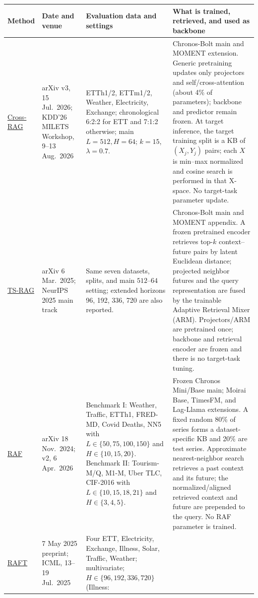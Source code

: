 \documentclass[10pt]{article}
\begin{document}
\small
\begin{longtable}{p{.14\linewidth}p{.17\linewidth}p{.27\linewidth}p{.31\linewidth}}
\toprule
Method & Date and venue & Evaluation data and settings & What is trained, retrieved, and used as backbone \\
\midrule
\endhead
\href{https://arxiv.org/pdf/2603.14709}{Cross-RAG}
& arXiv v3, 15 Jul.\ 2026; KDD'26 MILETS Workshop, 9--13 Aug.\ 2026
& ETTh1/2, ETTm1/2, Weather, Electricity, Exchange; chronological
6:2:2 for ETT and 7:1:2 otherwise; main $L=512,H=64$; $k=15$,
$\lambda=0.7$.
& Chronos-Bolt main and MOMENT extension.  Generic pretraining updates only
projectors and self/cross-attention (about 4\% of parameters); backbone and
predictor remain frozen. At target inference, the target training split is a
KB of $(X_j,Y_j)$ pairs; each $X$ is min--max normalized and cosine search is
performed in that X-space. No target-task parameter update.\\
\addlinespace
\href{https://proceedings.neurips.cc/paper_files/paper/2025/file/eed25c037bc08afcbefab6f7a6b700e0-Paper-Conference.pdf}{TS-RAG}
& arXiv 6 Mar.\ 2025; NeurIPS 2025 main track
& Same seven datasets, splits, and main $512$--$64$ setting; extended
horizons 96, 192, 336, 720 are also reported.
& Chronos-Bolt main and MOMENT appendix. A frozen pretrained encoder retrieves
top-$k$ context--future pairs by latent Euclidean distance; projected neighbor
futures and the query representation are fused by the trainable Adaptive
Retrieval Mixer (ARM). Projectors/ARM are pretrained once; backbone and
retrieval encoder are frozen and there is no target-task tuning.\\
\addlinespace
\href{https://arxiv.org/pdf/2411.08249}{RAF}
& arXiv 18 Nov.\ 2024; v2, 6 Apr.\ 2026
& Benchmark I: Weather, Traffic, ETTh1, FRED-MD, Covid Deaths, NN5 with
$L\in\{50,75,100,150\}$ and $H\in\{10,15,20\}$. Benchmark II: Tourism-M/Q,
M1-M, Uber TLC, CIF-2016 with $L\in\{10,15,18,21\}$ and
$H\in\{3,4,5\}$.
& Frozen Chronos Mini/Base main; Moirai Base, TimesFM, and Lag-Llama
extensions. A fixed random 80\% of series forms a dataset-specific KB and 20\%
are test series. Approximate nearest-neighbor search retrieves a past context
and its future; the normalized/aligned retrieved context and future are
prepended to the query. No RAF parameter is trained.\\
\addlinespace
\href{https://proceedings.mlr.press/v267/han25d.html}{RAFT}
& 7 May 2025 preprint; ICML, 13--19 Jul.\ 2025
& Four ETT, Electricity, Exchange, Illness, Solar, Traffic, Weather;
multivariate; $H\in\{96,192,336,720\}$ (Illness:

\end{longtable}
\end{document}

